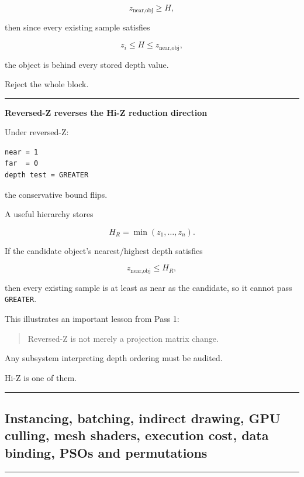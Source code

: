 \[
z_{\text{near,obj}}\ge H,
\]

then since every existing sample satisfies

\[
z_i\le H\le z_{\text{near,obj}},
\]

the object is behind every stored depth value.

Reject the whole block.

\begin{center}\rule{0.5\linewidth}{0.5pt}\end{center}

\textbf{Reversed-Z reverses the Hi-Z reduction direction}

Under reversed-Z:

\begin{verbatim}
near = 1
far  = 0
depth test = GREATER
\end{verbatim}

the conservative bound flips.

A useful hierarchy stores

\[
H_R=\min(z_1,\dots,z_n).
\]

If the candidate object's nearest/highest depth satisfies

\[
z_{\text{near,obj}}\le H_R,
\]

then every existing sample is at least as near as the candidate, so it cannot pass \texttt{GREATER}.

This illustrates an important lesson from Pass 1:

\begin{quote}
Reversed-Z is not merely a projection matrix change.
\end{quote}

Any subsystem interpreting depth ordering must be audited.

Hi-Z is one of them.

\begin{center}\rule{0.5\linewidth}{0.5pt}\end{center}

\subsection{Instancing, batching, indirect drawing, GPU culling, mesh shaders, execution cost, data binding, PSOs and permutations}\label{03-visual-computing-i-ch014-instancing-batching-indirect-drawing-gpu-culling-mesh-shaders-execution-cost-data-binding-psos-and-permutations}

\begin{center}\rule{0.5\linewidth}{0.5pt}\end{center}

